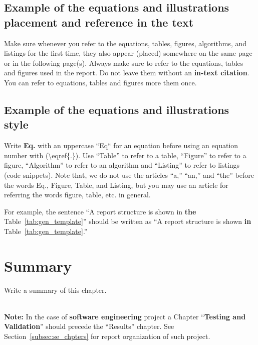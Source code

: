 \subsection{Example of the equations and illustrations placement and reference in the text}
Make sure whenever you refer to the equations, tables, figures, algorithms,  and listings for the first time, they also appear (placed) somewhere on the same page or in the following page(s). Always make sure to refer to the equations, tables and figures used in the report. Do not leave them without an \textbf{in-text citation}. You can refer to equations, tables and figures more them once.

\subsection{Example of the equations and illustrations style}
Write \textbf{Eq.} with an uppercase ``Eq`` for an equation before using an equation number with (\textbackslash eqref\{.\}). Use ``Table'' to refer to a table, ``Figure'' to refer to a figure, ``Algorithm'' to refer to an algorithm and ``Listing'' to refer to listings (code snippets). Note that, we do not use the articles ``a,'' ``an,'' and ``the'' before the words Eq., Figure, Table, and Listing, but you may use an article for referring the words figure, table, etc. in general.

For example, the sentence ``A report structure is shown in \textbf{the} Table~\ref{tab:gen_template}'' should be written as ``A report structure is shown \textbf{in} Table~\ref{tab:gen_template}.'' 
 

\section{Summary}
Write a summary of this chapter.

~\\[5em]
\noindent
{\huge\textbf{Note:}} In the case of \textbf{software engineering} project a Chapter ``\textbf{Testing and Validation}'' should precede the ``Results'' chapter. See Section~\ref{subsec:se_chpters} for report organization of such project. 

